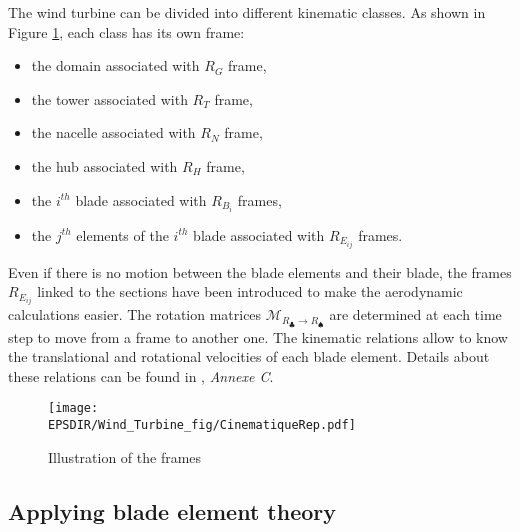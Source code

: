 The wind turbine can be divided into different kinematic classes. As shown in Figure \ref{fig:ALrep}, each class has its own frame:
\begin{multicols}{2}
\begin{itemize}
\item the domain associated with $R_G$ frame,
\item the tower associated with $R_T$ frame,
\item the nacelle associated with $R_N$ frame,
\item the hub associated with $R_H$ frame,
\item the $i^{th}$ blade associated with $R_{B_i}$ frames,
\item the $j^{th}$ elements of the $i^{th}$ blade associated with $R_{E_{ij}}$ frames.
\end{itemize}
\end{multicols}
\medbreak
Even if there is no motion between the blade elements and their blade, the frames $R_{E_{ij}}$ linked to the sections have been introduced to make the aerodynamic calculations easier. The rotation matrices $\mathcal{M}_{R_\clubsuit \rightarrow R_\spadesuit}$ are determined at each time step to move from a frame to another one. The kinematic relations allow to know the translational and rotational velocities of each blade element. Details about these relations can be found in \cite{joulin2019modelisation}, \textit{Annexe C}.
\medbreak
\begin{figure}[h]
\hspace{-1.8cm}
\texttt{[image: \\EPSDIR/Wind\_Turbine\_fig/CinematiqueRep.pdf]}
\caption{Illustration of the frames \cite{joulin2019modelisation}}  
\label{fig:ALrep}
\end{figure}

\subsection*{Applying blade element theory}
										

